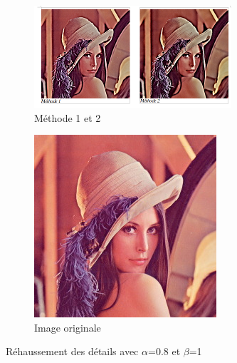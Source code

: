 \documentclass[twoside,UTF8]{EPURapport}
\begin{document}
\begin{figure}
	\centering
        \begin{subfigure}[b]{0.3\textwidth}
                \includegraphics[]{images/lena_08_1.png}
                \caption{Méthode 1 et 2}
        \end{subfigure}
        
        \begin{subfigure}[b]{0.3\textwidth}
                \includegraphics[scale=0.5]{images/lena.jpg}
             	\caption{Image originale}
        \end{subfigure}
        \caption{Réhaussement des détails avec $\alpha$=0.8 et $\beta$=1}
\end{figure}
\end{document}
